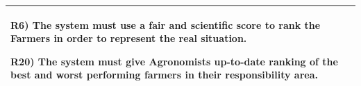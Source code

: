 \documentclass[table, 12pt]{article}
\begin{document}
\begin{itemize}
\begin{longtable}{|p{}|p{}|}
                                                                                       R6) The system must use a fair and scientific score to rank the Farmers in order to represent the real situation.
                                                                                       
                                                                                       R20) The system must give Agronomists up-to-date ranking of the best and worst performing farmers in their responsibility area.\\\hline
                    
        \end{longtable}
    
    \end{itemize}

        \newpage
\end{document}
